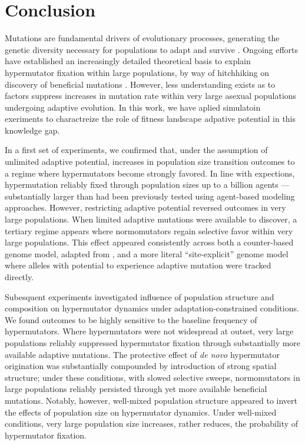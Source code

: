 \section{Conclusion} \label{sec:conclusion}

Mutations are fundamental drivers of evolutionary processes, generating the genetic diversity necessary for populations to adapt and survive \citep{hershberg2015mutation}.
Ongoing efforts have established an increasingly detailed theoretical basis to explain hypermutator fixation within large populations, by way of hitchhiking on discovery of beneficial mutations \citep{TODO}.
However, less understanding exists as to factors suppress increases in mutation rate within very large asexual populations undergoing adaptive evolution.
In this work, we have aplied simulatoin exeriments to charactreize the role of fitness landscape adpative potential in this knowledge gap.

In a first set of experiments, we confirmed that, under the assumption of unlimited adaptive potential, increases in population size transition outcomes to a regime where hypermutators become strongly favored.
In line with expections, hypermutation reliably fixed through population sizes up to a billion agents --- substantially larger than had been previously tested using agent-based modeling approaches.
However, restricting adaptive potential reversed outcomes in very large populations.
When limited adaptive mutations were available to discover, a tertiary regime appears where normomutators regain selective favor within very large populations.
This effect appeared consistently across both a counter-based genome model, adapted from \citet{raynes2018sign}, and a more literal ``site-explicit'' genome model where alleles with potential to experience adaptive mutation were tracked directly.

Subesquent experiments investigated influence of population structure and composition on hypermutator dynamics under adaptation-constrained conditions.
We found outcomes to be highly sensitive to the baseline frequency of hypermutators.
Where hypermutators were not widespread at outset, very large populations reliably suppressed hypermutator fixation through substantially more available adaptive mutations.
The protective effect of \textit{de novo} hypermutator origination was substantially compounded by introduction of strong spatial structure;
under these conditions, with slowed selective sweeps, normomutators in large populations reliably persisted through yet more available beneficial mutations.
Notably, however, well-mixed population structure appeared to invert the effects of population size on hypermutator dynamics.
Under well-mixed conditions, very large population size increases, rather reduces, the probability of hypermutator fixation.

